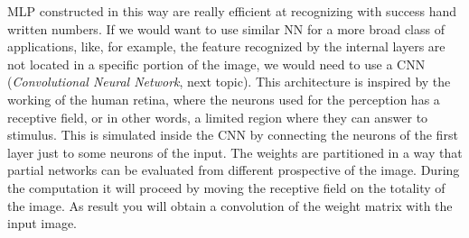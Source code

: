 \documentclass{article}
\begin{document}
MLP constructed in this way are really efficient at recognizing with success hand written numbers. If
we would want to use similar NN for a more broad class of applications, like, for example, the
feature recognized by the internal layers are not located in a specific portion of the image, we would
need to use a CNN (\textit{Convolutional Neural Network}, next topic). This architecture is inspired
by the working of the human retina, where the neurons used for the perception has a receptive field,
or in other words, a limited region where they can answer to stimulus.
\newline\newline
This is simulated inside the CNN by connecting the neurons of the first layer just to some neurons
of the input. The weights are partitioned in a way that partial networks can be evaluated  from
different prospective of the image.
\newline\newline
During the computation it will proceed by moving the receptive field on the totality of the image. As
result you will obtain a convolution of the weight matrix with the input image.
\end{document}
